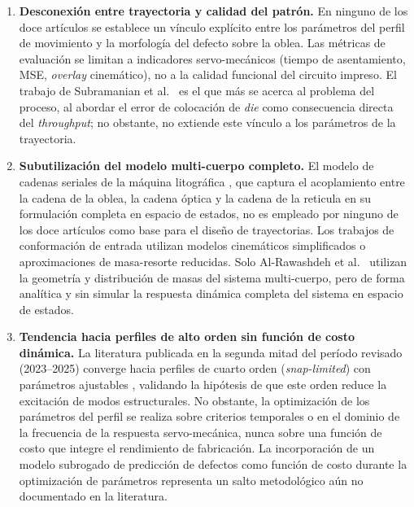 \documentclass[11pt]{article}
\theoremstyle{definition}
\begin{document}
\begin{enumerate}[label=\textbf{\arabic*.}]

\item \textbf{Desconexión entre trayectoria y calidad del patrón.} En ninguno de los doce artículos se establece un vínculo explícito entre los parámetros del perfil de movimiento y la morfología del defecto sobre la oblea. Las métricas de evaluación se limitan a indicadores servo-mecánicos (tiempo de asentamiento, MSE, \textit{overlay} cinemático), no a la calidad funcional del circuito impreso. El trabajo de Subramanian et al.\ \supercite{Subramanian2024} es el que más se acerca al problema del proceso, al abordar el error de colocación de \textit{die} como consecuencia directa del \textit{throughput}; no obstante, no extiende este vínculo a los parámetros de la trayectoria.

\item \textbf{Subutilización del modelo multi-cuerpo completo.} El modelo de cadenas seriales de la máquina litográfica \supercite{Al-Rawashdeh2022_Caracterization}, que captura el acoplamiento entre la cadena de la oblea, la cadena óptica y la cadena de la reticula en su formulación completa en espacio de estados, no es empleado por ninguno de los doce artículos como base para el diseño de trayectorias. Los trabajos de conformación de entrada utilizan modelos cinemáticos simplificados o aproximaciones de masa-resorte reducidas. Solo Al-Rawashdeh et al.\ \supercite{Al-Rawashdeh2023b} utilizan la geometría y distribución de masas del sistema multi-cuerpo, pero de forma analítica y sin simular la respuesta dinámica completa del sistema en espacio de estados.

\item \textbf{Tendencia hacia perfiles de alto orden sin función de costo dinámica.} La literatura publicada en la segunda mitad del período revisado (2023--2025) converge hacia perfiles de cuarto orden (\textit{snap-limited}) con parámetros ajustables \supercite{Heertjes2023_CDC, Al-Rawashdeh2023a}, validando la hipótesis de que este orden reduce la excitación de modos estructurales. No obstante, la optimización de los parámetros del perfil se realiza sobre criterios temporales o en el dominio de la frecuencia de la respuesta servo-mecánica, nunca sobre una función de costo que integre el rendimiento de fabricación. La incorporación de un modelo subrogado de predicción de defectos como función de costo durante la optimización de parámetros representa un salto metodológico aún no documentado en la literatura.

\end{enumerate}

\printbibliography
\end{document}
